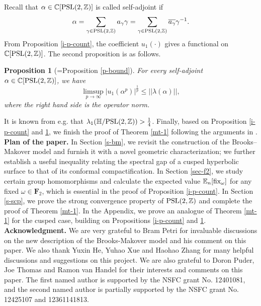 \documentclass{amsart}
\theoremstyle{plain}
\newtheorem{proposition}[theorem]{Proposition}
\theoremstyle{definition}
\theoremstyle{remark}
\begin{document}
Recall that $\alpha \in \mathbb{C}[\textnormal{PSL}(2,\mathbb{Z})]$ is called self-adjoint if
\[\alpha=\sum\limits_{\gamma\in\textnormal{PSL}(2,\mathbb{Z})}a_\gamma \gamma=\sum\limits_{\gamma\in\textnormal{PSL}(2,\mathbb{Z})}\overline{a_{\gamma}}\gamma^{-1}.\]
From Proposition \ref{i-p-count}, the coefficient $u_1(\cdot)$ gives a functional on $\mathbb{C}[\textnormal{PSL}(2,\mathbb{Z})]$. The second proposition is as follows.    
    \begin{proposition}[=Proposition \ref{p-bound}]\label{i-p-bound}
        For every self-adjoint $\alpha\in\mathbb{C}[\textnormal{PSL}(2,\mathbb{Z})]$, we have
        $$\limsup\limits_{p\to\infty}\left|u_1(\alpha^p)\right|^{\frac{1}{p}}\leq ||\lambda(\alpha)||,$$
        where the right hand side is the operator norm.
    \end{proposition}

It is known from e.g. \cite[Theorem 3.38]{Be-book} that $\lambda_1(\mathbb{H}/\textnormal{PSL}(2,\mathbb{Z}))>\frac{1}{4}$. Finally, based on Proposition \ref{i-p-count} and \ref{i-p-bound}, we finish the proof of Theorem \ref{mt-1} following the arguments in \cite{HMTcov, Moy25, MPvH25}.\\

\noindent\textbf{Plan of the paper.}
In Section \ref{s-bm}, we revisit the construction of the Brooks–Makover model and furnish it with a novel geometric characterization; we further establish a useful inequality relating the spectral gap of a cusped hyperbolic surface to that of its conformal compactification. In Section \ref{sec-f2}, we study certain group homomorphisms and calculate the expected value $\mathbb{E}_n[\textnormal{fix}_\omega]$ for any fixed $\omega\in\textbf{F}_2$, which is essential in the proof of Proposition \ref{i-p-count}. In Section \ref{s-scp}, we prove the strong convergence property of $\textnormal{PSL}(2,\mathbb{Z})$ and complete the proof of Theorem \ref{mt-1}. In the Appendix, we prove an analogue of Theorem \ref{mt-1} for the cusped case, building on Propositions \ref{i-p-count} and \ref{i-p-bound}. \\

\noindent\textbf{Acknowledgment.} We are very grateful to Bram Petri for invaluable discussions on the new description of the Brooks-Makover model and his comment on this
paper. We also thank Yuxin He, Yuhao Xue and Haohao Zhang for many helpful discussions and suggestions on this project. We are also grateful to Doron Puder, Joe Thomas and Ramon van Handel for their interests and comments on this paper. The first named author is supported by the NSFC grant No. 12401081, and the second named author is partially supported by the NSFC grant No. 12425107 and 12361141813.
\end{document}
